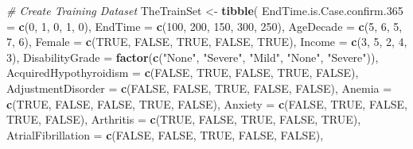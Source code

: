 \documentclass[
]{article}
\newenvironment{Shaded}{\begin{snugshade}}{\end{snugshade}}
\newcommand{\AttributeTok}[1]{\textcolor[rgb]{0.13,0.29,0.53}{#1}}
\newcommand{\CommentTok}[1]{\textcolor[rgb]{0.56,0.35,0.01}{\textit{#1}}}
\newcommand{\ConstantTok}[1]{\textcolor[rgb]{0.56,0.35,0.01}{#1}}
\newcommand{\DecValTok}[1]{\textcolor[rgb]{0.00,0.00,0.81}{#1}}
\newcommand{\FunctionTok}[1]{\textcolor[rgb]{0.13,0.29,0.53}{\textbf{#1}}}
\newcommand{\NormalTok}[1]{#1}
\newcommand{\OtherTok}[1]{\textcolor[rgb]{0.56,0.35,0.01}{#1}}
\newcommand{\StringTok}[1]{\textcolor[rgb]{0.31,0.60,0.02}{#1}}
\begin{document}
\begin{Shaded}
\begin{Highlighting}[]
\CommentTok{\# Create Training Dataset}
\NormalTok{TheTrainSet }\OtherTok{\textless{}{-}} \FunctionTok{tibble}\NormalTok{(}
  \AttributeTok{EndTime.is.Case.confirm.365 =} \FunctionTok{c}\NormalTok{(}\DecValTok{0}\NormalTok{, }\DecValTok{1}\NormalTok{, }\DecValTok{0}\NormalTok{, }\DecValTok{1}\NormalTok{, }\DecValTok{0}\NormalTok{),}
  \AttributeTok{EndTime =} \FunctionTok{c}\NormalTok{(}\DecValTok{100}\NormalTok{, }\DecValTok{200}\NormalTok{, }\DecValTok{150}\NormalTok{, }\DecValTok{300}\NormalTok{, }\DecValTok{250}\NormalTok{),}
  \AttributeTok{AgeDecade =} \FunctionTok{c}\NormalTok{(}\DecValTok{5}\NormalTok{, }\DecValTok{6}\NormalTok{, }\DecValTok{5}\NormalTok{, }\DecValTok{7}\NormalTok{, }\DecValTok{6}\NormalTok{),}
  \AttributeTok{Female =} \FunctionTok{c}\NormalTok{(}\ConstantTok{TRUE}\NormalTok{, }\ConstantTok{FALSE}\NormalTok{, }\ConstantTok{TRUE}\NormalTok{, }\ConstantTok{FALSE}\NormalTok{, }\ConstantTok{TRUE}\NormalTok{),}
  \AttributeTok{Income =} \FunctionTok{c}\NormalTok{(}\DecValTok{3}\NormalTok{, }\DecValTok{5}\NormalTok{, }\DecValTok{2}\NormalTok{, }\DecValTok{4}\NormalTok{, }\DecValTok{3}\NormalTok{),}
  \AttributeTok{DisabilityGrade =} \FunctionTok{factor}\NormalTok{(}\FunctionTok{c}\NormalTok{(}\StringTok{"None"}\NormalTok{, }\StringTok{"Severe"}\NormalTok{, }\StringTok{"Mild"}\NormalTok{, }\StringTok{"None"}\NormalTok{, }\StringTok{"Severe"}\NormalTok{)),}
  \AttributeTok{AcquiredHypothyroidism =} \FunctionTok{c}\NormalTok{(}\ConstantTok{FALSE}\NormalTok{, }\ConstantTok{TRUE}\NormalTok{, }\ConstantTok{FALSE}\NormalTok{, }\ConstantTok{TRUE}\NormalTok{, }\ConstantTok{FALSE}\NormalTok{),}
  \AttributeTok{AdjustmentDisorder =} \FunctionTok{c}\NormalTok{(}\ConstantTok{FALSE}\NormalTok{, }\ConstantTok{FALSE}\NormalTok{, }\ConstantTok{TRUE}\NormalTok{, }\ConstantTok{FALSE}\NormalTok{, }\ConstantTok{FALSE}\NormalTok{),}
  \AttributeTok{Anemia =} \FunctionTok{c}\NormalTok{(}\ConstantTok{TRUE}\NormalTok{, }\ConstantTok{FALSE}\NormalTok{, }\ConstantTok{FALSE}\NormalTok{, }\ConstantTok{TRUE}\NormalTok{, }\ConstantTok{FALSE}\NormalTok{),}
  \AttributeTok{Anxiety =} \FunctionTok{c}\NormalTok{(}\ConstantTok{FALSE}\NormalTok{, }\ConstantTok{TRUE}\NormalTok{, }\ConstantTok{FALSE}\NormalTok{, }\ConstantTok{TRUE}\NormalTok{, }\ConstantTok{FALSE}\NormalTok{),}
  \AttributeTok{Arthritis =} \FunctionTok{c}\NormalTok{(}\ConstantTok{TRUE}\NormalTok{, }\ConstantTok{FALSE}\NormalTok{, }\ConstantTok{TRUE}\NormalTok{, }\ConstantTok{FALSE}\NormalTok{, }\ConstantTok{TRUE}\NormalTok{),}
  \AttributeTok{AtrialFibrillation =} \FunctionTok{c}\NormalTok{(}\ConstantTok{FALSE}\NormalTok{, }\ConstantTok{FALSE}\NormalTok{, }\ConstantTok{TRUE}\NormalTok{, }\ConstantTok{FALSE}\NormalTok{, }\ConstantTok{FALSE}\NormalTok{),}

\end{Highlighting}
\end{Shaded}
\end{document}
